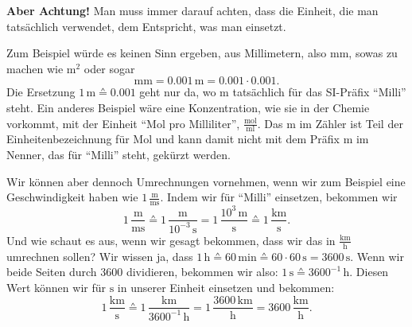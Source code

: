 \documentclass[../../main.tex]{subfiles}
\begin{document}
    \textbf{Aber Achtung!} Man muss immer darauf achten, dass die Einheit, die man tatsächlich verwendet, dem
    Entspricht, was man einsetzt.
    \begin{example}{}
        Zum Beispiel würde es keinen Sinn ergeben, aus Millimetern, also $\text{mm}$, sowas zu machen wie $\text{m}^2$
        oder sogar
        \[\text{mm} = 0.001\,\text{m} = 0.001\cdot 0.001.\]
        Die Ersetzung $1\,\text{m} \corresponds 0.001$ geht nur da, wo $\text{m}$ tatsächlich für das SI-Präfix
        \enquote{Milli} steht.
        Ein anderes Beispiel wäre eine Konzentration, wie sie in der Chemie vorkommt, mit der Einheit
        \enquote{Mol pro Milliliter}, $\frac{\text{mol}}{\text{ml}}$.
        Das $\text{m}$ im Zähler ist Teil der Einheitenbezeichnung für Mol und kann damit nicht mit dem Präfix
        $\text{m}$ im Nenner, das für \enquote{Milli} steht, gekürzt werden.

        Wir können aber dennoch Umrechnungen vornehmen, wenn wir zum Beispiel eine Geschwindigkeit haben wie
        $1\,\frac{\text{m}}{\text{ms}}$.
        Indem wir für \enquote{Milli} einsetzen, bekommen wir
        \[
            1\,\frac{\text{m}}{\text{ms}} \corresponds 1\,\frac{\text{m}}{10^{-3}\,\text{s}}
            = 1\,\frac{10^3\,\text{m}}{\text{s}} \corresponds 1\,\frac{\text{km}}{\text{s}}.
        \]
        Und wie schaut es aus, wenn wir gesagt bekommen, dass wir das in $\frac{\text{km}}{\text{h}}$ umrechnen sollen?
        Wir wissen ja, dass $1\,\text{h} \corresponds 60\,\text{min} \corresponds 60\cdot 60\,\text{s} = 3600\,\text{s}$.
        Wenn wir beide Seiten durch $3600$ dividieren, bekommen wir also: $1\,\text{s} \corresponds 3600^{-1}\,\text{h}$.
        Diesen Wert können wir für $\text{s}$ in unserer Einheit einsetzen und bekommen:
        \[
            1\,\frac{\text{km}}{\text{s}} \corresponds 1\,\frac{\text{km}}{3600^{-1}\,\text{h}}
            = 1\,\frac{3600\,\text{km}}{\text{h}} = 3600\,\frac{\text{km}}{\text{h}}.
        \]
    \end{example}
\end{document}
